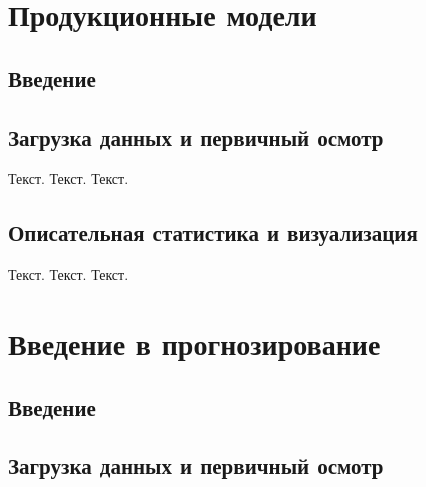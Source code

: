 \documentclass[
  letterpaper,
  DIV=11,
  numbers=noendperiod]{scrreprt}
\begin{document}

\chapter{Продукционные
модели}\label{ux43fux440ux43eux434ux443ux43aux446ux438ux43eux43dux43dux44bux435-ux43cux43eux434ux435ux43bux438}

\section{Введение}\label{ux432ux432ux435ux434ux435ux43dux438ux435-6}

\section{Загрузка данных и первичный
осмотр}\label{ux437ux430ux433ux440ux443ux437ux43aux430-ux434ux430ux43dux43dux44bux445-ux438-ux43fux435ux440ux432ux438ux447ux43dux44bux439-ux43eux441ux43cux43eux442ux440-1}

Текст. Текст. Текст.

\section{Описательная статистика и
визуализация}\label{ux43eux43fux438ux441ux430ux442ux435ux43bux44cux43dux430ux44f-ux441ux442ux430ux442ux438ux441ux442ux438ux43aux430-ux438-ux432ux438ux437ux443ux430ux43bux438ux437ux430ux446ux438ux44f-1}

Текст. Текст. Текст.


\chapter{Введение в
прогнозирование}\label{ux432ux432ux435ux434ux435ux43dux438ux435-ux432-ux43fux440ux43eux433ux43dux43eux437ux438ux440ux43eux432ux430ux43dux438ux435}

\section{Введение}\label{ux432ux432ux435ux434ux435ux43dux438ux435-7}

\section{Загрузка данных и первичный
осмотр}\label{ux437ux430ux433ux440ux443ux437ux43aux430-ux434ux430ux43dux43dux44bux445-ux438-ux43fux435ux440ux432ux438ux447ux43dux44bux439-ux43eux441ux43cux43eux442ux440-2}
\end{document}
